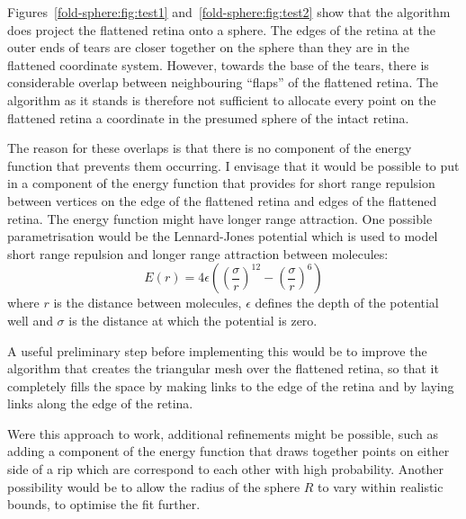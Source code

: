 \documentclass{article}
\begin{document}
Figures~\ref{fold-sphere:fig:test1} and~\ref{fold-sphere:fig:test2}
show that the algorithm does project the flattened retina onto a
sphere. The edges of the retina at the outer ends of tears are closer
together on the sphere than they are in the flattened coordinate
system. However, towards the base of the tears, there is considerable
overlap between neighbouring ``flaps'' of the flattened retina. The
algorithm as it stands is therefore not sufficient to allocate every
point on the flattened retina a coordinate in the presumed sphere of
the intact retina.

The reason for these overlaps is that there is no component of the
energy function that prevents them occurring. I envisage that it would
be possible to put in a component of the energy function that provides
for short range repulsion between vertices on the edge of the
flattened retina and edges of the flattened retina. The energy
function might have longer range attraction. One possible
parametrisation would be the Lennard-Jones potential which is used to
model short range repulsion and longer range attraction between
molecules:
\begin{equation}
  \label{fold-sphere:eq:4}
  E(r) = 4\epsilon\left(\left(\frac{\sigma}{r}\right)^{12}-
    \left(\frac{\sigma}{r}\right)^{6}\right)
\end{equation}
where $r$ is the distance between molecules, $\epsilon$ defines the
depth of the potential well and $\sigma$ is the distance at which the
potential is zero.

A useful preliminary step before implementing this would be to improve
the algorithm that creates the triangular mesh over the flattened
retina, so that it completely fills the space by making links to the
edge of the retina and by laying links along the edge of the retina.

Were this approach to work, additional refinements might be possible,
such as adding a component of the energy function that draws together
points on either side of a rip which are correspond to each other with
high probability. Another possibility would be to allow the radius of
the sphere $R$ to vary within realistic bounds, to optimise the fit
further.
\end{document}
